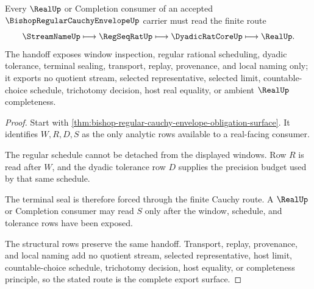 \begin{theorem}
\label{thm:bishop-regular-cauchy-envelope-real-seal-handoff}
Every $\RealUp$ or Completion consumer of an accepted $\BishopRegularCauchyEnvelopeUp$ carrier must read the finite route
$$
\StreamNameUp \longmapsto \RegSeqRatUp \longmapsto \DyadicRatCoreUp \longmapsto \RealUp .
$$
The handoff exposes window inspection, regular rational scheduling, dyadic tolerance, terminal sealing, transport, replay, provenance, and local naming only; it exports no quotient stream, selected representative, selected limit, countable-choice schedule, trichotomy decision, host real equality, or ambient $\RealUp$ completeness.
\end{theorem}
\begin{proof}
Start with \autoref{thm:bishop-regular-cauchy-envelope-obligation-surface}. It identifies $W,R,D,S$ as the only analytic rows available to a real-facing consumer.

The regular schedule cannot be detached from the displayed windows. Row $R$ is read after $W$, and the dyadic tolerance row $D$ supplies the precision budget used by that same schedule.

The terminal seal is therefore forced through the finite Cauchy route. A $\RealUp$ or Completion consumer may read $S$ only after the window, schedule, and tolerance rows have been exposed.

The structural rows preserve the same handoff. Transport, replay, provenance, and local naming add no quotient stream, selected representative, host limit, countable-choice schedule, trichotomy decision, host equality, or completeness principle, so the stated route is the complete export surface.
\end{proof}



